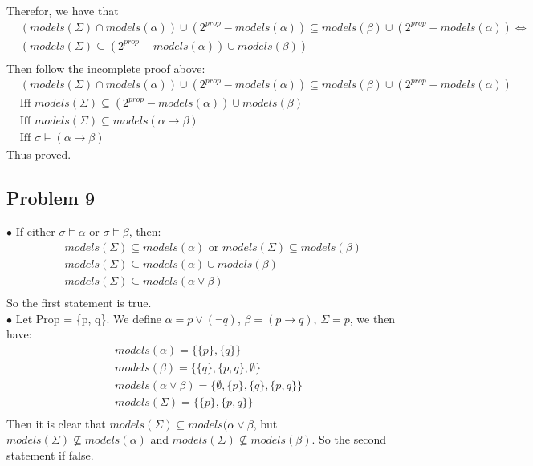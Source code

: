 \documentclass[12pt]{article}
\begin{document}
Therefor, we have that 
\begin{align*}
    &(models(\Sigma) \cap models(\alpha)) \cup (2^{prop} - models(\alpha)) \subseteq models(\beta) \cup (2^{prop} - models(\alpha))\Leftrightarrow \\
    &(models(\Sigma) \subseteq (2^{prop} - models(\alpha)) \cup models(\beta))\\
\end{align*}
Then follow the incomplete proof above:
\begin{align*}
    & (models(\Sigma) \cap models(\alpha)) \cup (2^{prop} - models(\alpha)) \subseteq models(\beta) \cup (2^{prop} - models(\alpha))\\
    & \text{Iff  } models(\Sigma) \subseteq (2^{prop} - models(\alpha)) \cup models(\beta)\\
    & \text{Iff  } models(\Sigma) \subseteq models(\alpha \rightarrow \beta)\\
    & \text{Iff  } \sigma \models (\alpha \rightarrow \beta)
\end{align*}
Thus proved. 
\subsection*{Problem 9}
$\bullet$ If either $\sigma \models \alpha$ or $\sigma \models \beta$, then: 
\begin{align*}
    &models(\Sigma) \subseteq models (\alpha) \text{ or } models(\Sigma) \subseteq models(\beta)\\
    &models(\Sigma) \subseteq models(\alpha) \cup models(\beta)\\
    &models(\Sigma) \subseteq models(\alpha \vee \beta)\\
\end{align*}
So the first statement is true.\\[5pt]
$\bullet$ Let Prop = \{p, q\}. We define $\alpha = p\vee (\neg q)$, $\beta = (p \rightarrow q)$, $\Sigma = p$, we then have: 
\begin{align*}
    models(\alpha) = \{\{p\}, \{q\}\}\\
    models(\beta) = \{\{q\}, \{p,q\}, \emptyset\}\\
    models(\alpha \vee \beta) = \{\emptyset, \{p\}, \{q\},\{p,q\}\}\\
    models(\Sigma) = \{\{p\}, \{p, q\}\}\\
\end{align*}
Then it is clear that $models(\Sigma) \subseteq models(\alpha \vee \beta$, but $models(\Sigma) \nsubseteq models(\alpha)$ and $models(\Sigma) \nsubseteq models(\beta)$. So the second statement if false. 
\end{document}
